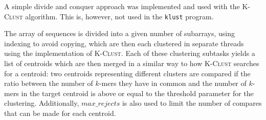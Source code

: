 A simple divide and conquer approach was implemented and used with the
\textsc{K-Clust} algorithm. This is, however, not used in the \texttt{klust}
program.

The array of sequences is divided into a given number of subarrays, using
indexing to avoid copying, which are then each clustered in separate threads
using the implementation of \textsc{K-Clust}.  Each of these clustering
subtasks yields a list of centroids which are then merged in a similar way to
how \textsc{K-Clust} searches for a centroid: two centroids representing
different clusters are compared if the ratio between the number of $k$-mers
they have in common and the number of $k$-mers in the target centroid is above
or equal to the threshold parameter for the clustering. Additionally,
$max\_rejects$ is also used to limit the number of compares that can be made
for each centroid.
